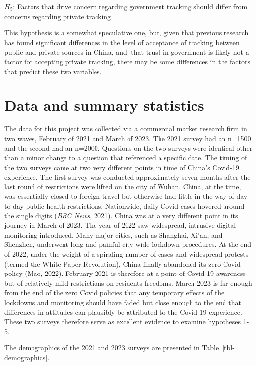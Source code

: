 \documentclass[
  letterpaper,
  DIV=11,
  numbers=noendperiod]{scrartcl}
\begin{document}
\(H_5\): Factors that drive concern regarding government tracking should
differ from concerns regarding private tracking

This hypothesis is a somewhat speculative one, but, given that previous
research has found significant differences in the level of acceptance of
tracking between public and private sources in China, and, that trust in
government is likely not a factor for accepting private tracking, there
may be some differences in the factors that predict these two variables.

\section{Data and summary statistics}\label{sec-datasummary}

The data for this project was collected via a commercial market research
firm in two waves, February of 2021 and March of 2023. The 2021 survey
had an n=1500 and the second had an n=2000. Questions on the two surveys
were identical other than a minor change to a question that referenced a
specific date. The timing of the two surveys came at two very different
points in time of China's Covid-19 experience. The first survey was
conducted approximately seven months after the last round of
restrictions were lifted on the city of Wuhan. China, at the time, was
essentially closed to foreign travel but otherwise had little in the way
of day to day public health restrictions. Nationwide, daily Covid cases
hovered around the single digits (\emph{BBC News}, 2021). China was at a
very different point in its journey in March of 2023. The year of 2022
saw widespread, intrusive digital monitoring introduced. Many major
cities, such as Shanghai, Xi'an, and Shenzhen, underwent long and
painful city-wide lockdown procedures. At the end of 2022, under the
weight of a spiraling number of cases and widespread protests (termed
the White Paper Revolution), China finally abandoned its zero Covid
policy (Mao, 2022). February 2021 is therefore at a point of Covid-19
awareness but of relatively mild restrictions on residents freedoms.
March 2023 is far enough from the end of the zero Covid policies that
any temporary effects of the lockdowns and monitoring should have faded
but close enough to the end that differences in attitudes can plausibly
be attributed to the Covid-19 experience. These two surveys therefore
serve as excellent evidence to examine hypotheses 1-5.

The demographics of the 2021 and 2023 surveys are presented in
Table~\ref{tbl-demographics}.
\end{document}
